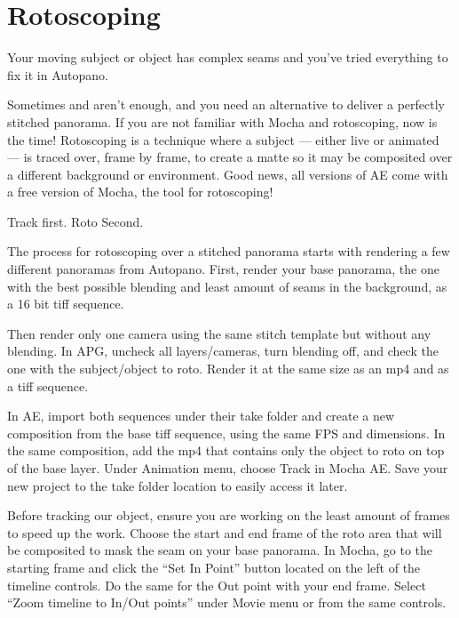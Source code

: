 \chapter{Rotoscoping}
\pagecolor{white}
\label{chap:50}
\begin{fullwidth}

\problem

{\large Your moving subject or object has complex seams and you’ve tried everything to fix it in Autopano. \par}

Sometimes \textbf{} and \textbf{} aren’t enough, and you need an alternative to deliver a perfectly stitched panorama. If you are not familiar with Mocha and rotoscoping, now is the time! Rotoscoping is a technique where a subject — either live or animated — is traced over, frame by frame, to create a matte so it may be composited over a different background or environment. Good news, all versions of AE come with a free version of Mocha, the tool for rotoscoping! 

\clearpage
\solution

{\large Track first. Roto Second. \par}

The process for rotoscoping over a stitched panorama starts with rendering a few different panoramas from Autopano. First, render your base panorama, the one with the best possible blending and least amount of seams in the background, as a 16 bit tiff sequence. 


Then render only one camera using the same stitch template but without any blending. In APG, uncheck all layers/cameras, turn blending off, and check the one with the subject/object to roto. Render it at the same size as an mp4 and as a tiff sequence.


In AE, import both sequences under their take folder and create a new composition from the base tiff sequence, using the same FPS and dimensions. In the same composition, add the mp4 that contains only the object to roto on top of the base layer. Under Animation menu, choose Track in Mocha AE. Save your new project to the take folder location to easily access it later. 


Before tracking our object, ensure you are working on the least amount of frames to speed up the work. Choose the start and end frame of the roto area that will be composited to mask the seam on your base panorama. In Mocha, go to the starting frame and click the “Set In Point” button located on the left of the timeline controls. Do the same for the Out point with your end frame. Select “Zoom timeline to In/Out points” under Movie menu or from the same controls.


\end{fullwidth}
